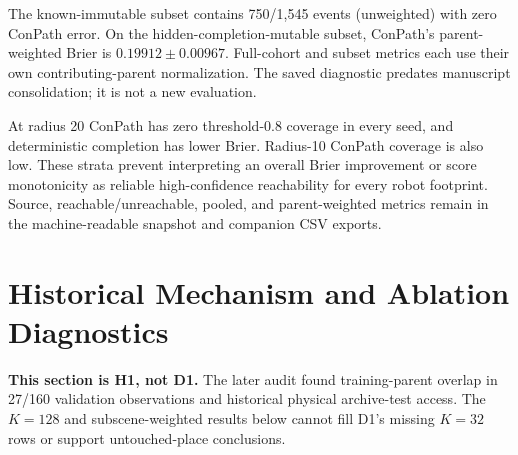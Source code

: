 \documentclass[conference,letterpaper,10pt,onecolumn]{IEEEtran}
\begin{document}
\begin{table}[H]\centering\small
\caption{D1 fixed rule controls (T1d). Rules have one deterministic evaluation, not three optimization seeds. The radius prior has no sampled map; its archived $K=1$ filename tag is not a map count. A dash at zero coverage means undefined risk.}

\end{table}

\begin{table}[H]\centering\small
\caption{D1 previously saved post-hoc conditional-mean threshold controls (T1e). The threshold remains 0.5 and each output is one binary map. These are distinct from the separately trained deterministic baseline. NLL/ECE were not stored and are not fabricated.}

\end{table}
The known-immutable subset contains 750/1,545 events (unweighted) with zero ConPath error. On the hidden-completion-mutable subset, ConPath's parent-weighted Brier is $0.19912\pm0.00967$. Full-cohort and subset metrics each use their own contributing-parent normalization. The saved diagnostic predates manuscript consolidation; it is not a new evaluation.

\begin{table}[H]\centering\small
\caption{D1 descriptive radius strata from the unchanged numeric snapshot. Three seeds; equal-parent normalization within each radius. Brier is mean $\pm$ sample SD; other displayed values are seed means. Undefined threshold risk is retained when no seed accepts any event. Radii are grid cells.}

\end{table}
At radius 20 ConPath has zero threshold-0.8 coverage in every seed, and deterministic completion has lower Brier. Radius-10 ConPath coverage is also low. These strata prevent interpreting an overall Brier improvement or score monotonicity as reliable high-confidence reachability for every robot footprint. Source, reachable/unreachable, pooled, and parent-weighted metrics remain in the machine-readable snapshot and companion CSV exports.

\clearpage
\section{Historical Mechanism and Ablation Diagnostics}
\textbf{This section is H1, not D1.} The later audit found training-parent overlap in 27/160 validation observations and historical physical archive-test access. The $K=128$ and subscene-weighted results below cannot fill D1's missing $K=32$ rows or support untouched-place conclusions.
\end{document}
